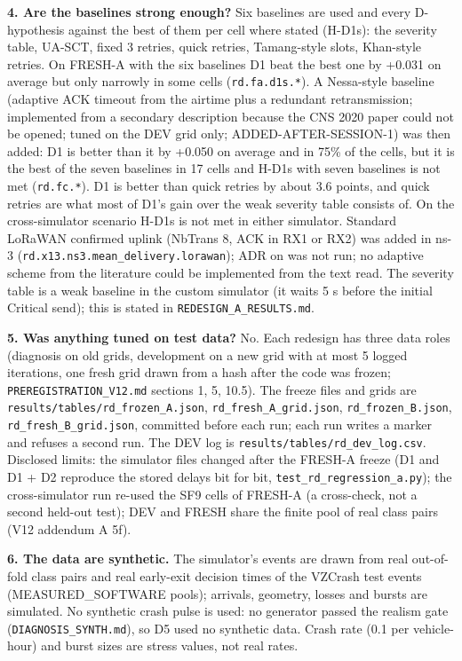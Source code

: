 \textbf{4. Are the baselines strong enough?}
Six baselines are used and every D-hypothesis against the best of them per cell where stated (H-D1s): the severity table, UA-SCT, fixed 3 retries, quick retries, Tamang-style slots, Khan-style retries. On FRESH-A with the six baselines D1 beat the best one by +0.031 on average but only narrowly in some cells (\texttt{rd.fa.d1s.*}). A Nessa-style baseline (adaptive ACK timeout from the airtime plus a redundant retransmission; implemented from a secondary description because the CNS 2020 paper could not be opened; tuned on the DEV grid only; ADDED-AFTER-SESSION-1) was then added: D1 is better than it by +0.050 on average and in 75\% of the cells, but it is the best of the seven baselines in 17 cells and H-D1s with seven baselines is not met (\texttt{rd.fc.*}). D1 is better than quick retries by about 3.6 points, and quick retries are what most of D1's gain over the weak severity table consists of. On the cross-simulator scenario H-D1s is not met in either simulator. Standard LoRaWAN confirmed uplink (NbTrans 8, ACK in RX1 or RX2) was added in ns-3 (\texttt{rd.x13.ns3.mean\_delivery.lorawan}); ADR on was not run; no adaptive scheme from the literature could be implemented from the text read. The severity table is a weak baseline in the custom simulator (it waits 5 s before the initial Critical send); this is stated in \texttt{REDESIGN\_A\_RESULTS.md}.

\textbf{5. Was anything tuned on test data?}
No. Each redesign has three data roles (diagnosis on old grids, development on a new grid with at most 5 logged iterations, one fresh grid drawn from a hash after the code was frozen; \texttt{PREREGISTRATION\_V12.md} sections 1, 5, 10.5). The freeze files and grids are \texttt{results/tables/rd\_frozen\_A.json}, \texttt{rd\_fresh\_A\_grid.json}, \texttt{rd\_frozen\_B.json}, \texttt{rd\_fresh\_B\_grid.json}, committed before each run; each run writes a marker and refuses a second run. The DEV log is \texttt{results/tables/rd\_dev\_log.csv}. Disclosed limits: the simulator files changed after the FRESH-A freeze (D1 and D1 + D2 reproduce the stored delays bit for bit, \texttt{test\_rd\_regression\_a.py}); the cross-simulator run re-used the SF9 cells of FRESH-A (a cross-check, not a second held-out test); DEV and FRESH share the finite pool of real class pairs (V12 addendum A 5f).

\textbf{6. The data are synthetic.}
The simulator's events are drawn from real out-of-fold class pairs and real early-exit decision times of the VZCrash test events (MEASURED\_SOFTWARE pools); arrivals, geometry, losses and bursts are simulated. No synthetic crash pulse is used: no generator passed the realism gate (\texttt{DIAGNOSIS\_SYNTH.md}), so D5 used no synthetic data. Crash rate (0.1 per vehicle-hour) and burst sizes are stress values, not real rates.

